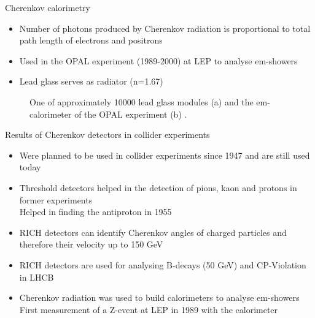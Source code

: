 \documentclass[aspectratio=1610, 10pt]{beamer}
\begin{document}
\begin{frame}{Cherenkov calorimetry}
  \begin{itemize}
    \item Number of photons produced by Cherenkov radiation is proportional to total path length of
    electrons and positrons
    \medskip
    \item Used in the OPAL experiment (1989-2000) at LEP to analyse em-showers
    \medskip
    \item Lead glass serves as radiator (n=1.67)%
  \end{itemize}
  \begin{figure}
      \hspace{1cm}
  \caption{One of approximately 10000 lead glass modules (a) and the em-calorimeter of the OPAL experiment (b) \cite{lead}\cite{atr}.}
  \end{figure}
\end{frame}

\begin{frame}{Results of Cherenkov detectors in collider experiments}
  \begin{itemize}
    \item Were planned to be used in collider experiments since 1947 and are still used today
    \medskip
    \item Threshold detectors helped in the detection of pions, kaon and protons in former experiments\\
    \rightarrow Helped in finding the antiproton in 1955
    \medskip
    \item RICH detectors can identify Cherenkov angles of charged particles and therefore their velocity up to 150 GeV
    \medskip
    \item RICH detectors are used for analysing B-decays (50 GeV) and CP-Violation in LHCB
    \medskip
    \item Cherenkov radiation was used to build calorimeters to analyse em-showers \\
    \rightarrow First measurement of a Z-event at LEP in 1989 with the calorimeter

  \end{itemize}
\end{frame}
\end{document}
